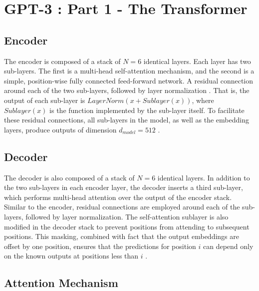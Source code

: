 \chapter*{GPT-3 : Part 1 - The Transformer}
\label{chap:transformer}
\thispagestyle{fancy}

\section*{Encoder}
\label{sec:encdr}

\hspace{0.5cm} The encoder is composed of a stack of $N = 6$ identical layers. Each layer has two sub-layers. The first is a multi-head self-attention mechanism, and the second is a simple, position-wise fully connected feed-forward network. A residual connection \cite{2016arXiv160202410J} around each of the two sub-layers, followed by layer normalization \cite{2016arXiv160706450L}. That is, the output of each sub-layer is $LayerNorm(x + Sublayer(x))$, where $Sublayer(x)$ is the function implemented by the sub-layer itself. To facilitate these residual connections, all sub-layers in the model, as well as the embedding layers, produce outputs of dimension $d_{model} = 512$ \cite{2017arXiv170603762V}.

\section*{Decoder}
\label{sec:decdr}

\hspace{0.5cm} The decoder is also composed of a stack of $N = 6$ identical layers. In addition to the two sub-layers in each encoder layer, the decoder inserts a third sub-layer, which performs multi-head attention over the output of the encoder stack. Similar to the encoder, residual connections are employed around each of the sub-layers, followed by layer normalization. The self-attention sublayer is also modified in the decoder stack to prevent positions from attending to subsequent positions. This masking, combined with fact that the output embeddings are offset by one position, ensures that the predictions for position $i$ can depend only on the known outputs at positions less than $i$ \cite{2017arXiv170603762V}.

\section*{Attention Mechanism}
\label{sec:attnmec}

